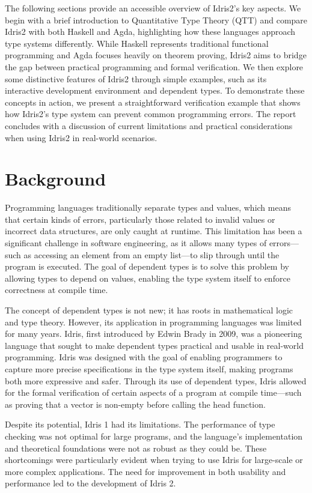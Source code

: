 \documentclass[]{rptuseminar}
\begin{document}
The following sections provide an accessible overview of Idris2's key aspects.
We begin with a brief introduction to Quantitative Type Theory (QTT) and compare Idris2 with both Haskell and Agda, highlighting how these languages approach type systems differently.
While Haskell represents traditional functional programming and Agda focuses heavily on theorem proving, Idris2 aims to bridge the gap between practical programming and formal verification.
We then explore some distinctive features of Idris2 through simple examples, such as its interactive development environment and dependent types.
To demonstrate these concepts in action, we present a straightforward verification example that shows how Idris2's type system can prevent common programming errors.
The report concludes with a discussion of current limitations and practical considerations when using Idris2 in real-world scenarios.

\section{Background}  
\label{sec:background}  
Programming languages traditionally separate types and values, which means that certain kinds of errors, particularly those related to invalid values or incorrect data structures, are only caught at runtime. This limitation has been a significant challenge in software engineering, as it allows many types of errors—such as accessing an element from an empty list—to slip through until the program is executed. The goal of dependent types is to solve this problem by allowing types to depend on values, enabling the type system itself to enforce correctness at compile time.

The concept of dependent types is not new; it has roots in mathematical logic and type theory. However, its application in programming languages was limited for many years. Idris, first introduced by Edwin Brady in 2009, was a pioneering language that sought to make dependent types practical and usable in real-world programming. Idris was designed with the goal of enabling programmers to capture more precise specifications in the type system itself, making programs both more expressive and safer. Through its use of dependent types, Idris allowed for the formal verification of certain aspects of a program at compile time—such as proving that a vector is non-empty before calling the head function.

Despite its potential, Idris 1 had its limitations. The performance of type checking was not optimal for large programs, and the language’s implementation and theoretical foundations were not as robust as they could be. These shortcomings were particularly evident when trying to use Idris for large-scale or more complex applications. The need for improvement in both usability and performance led to the development of Idris 2.
\end{document}

